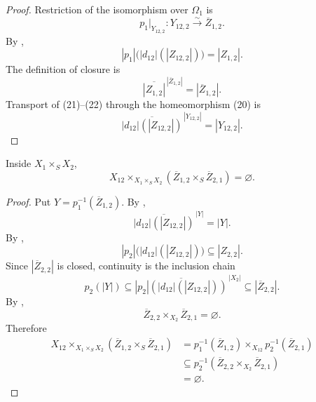 \begin{proof}
  Restriction of the isomorphism over $\Omega_1$ is
  \[
    p_1|_{Y_{12,2}}\colon
      Y_{12,2}\xrightarrow{\sim}\overline Z_{1,2}.                 \tag{20}
  \]
  By ,
  \[
    |p_1|\bigl(|d_{12}|(|Z_{12,2}|)\bigr)=|Z_{1,2}|.              \tag{21}
  \]
  The definition of closure is
  \[
    \overline{|Z_{1,2}|}^{\,|\overline Z_{1,2}|}
      =|\overline Z_{1,2}|.                                      \tag{22}
  \]
  Transport of (21)--(22) through the homeomorphism (20) is
  \[
    \overline{|d_{12}|(|Z_{12,2}|)}^{\,|Y_{12,2}|}=|Y_{12,2}|.
  \]
\end{proof}

\begin{lemma}
  \label{lemma:nagata-key-boundary-disjointness}

  Inside $X_1\times_SX_2$,
  \[
    X_{12}\times_{X_1\times_SX_2}
      (\overline Z_{1,2}\times_S\overline Z_{2,1})
    =\varnothing.
  \]
\end{lemma}

\begin{proof}
  Put $Y=p_1^{-1}(\overline Z_{1,2})$.  By
  ,
  \[
    \overline{|d_{12}|(|Z_{12,2}|)}^{\,|Y|}=|Y|.                  \tag{23}
  \]
  By ,
  \[
    |p_2|\bigl(|d_{12}|(|Z_{12,2}|)\bigr)\subseteq|Z_{2,2}|.      \tag{24}
  \]
  Since $|\overline Z_{2,2}|$ is closed, continuity is the inclusion chain
  \[
    p_2(|Y|)
      \subseteq
      \overline{|p_2|(|d_{12}|(|Z_{12,2}|))}^{\,|X_2|}
      \subseteq|\overline Z_{2,2}|.                               \tag{25}
  \]
  By ,
  \[
    \overline Z_{2,2}\times_{X_2}\overline Z_{2,1}=\varnothing.   \tag{26}
  \]
  Therefore
  \[
  \begin{aligned}
    X_{12}\times_{X_1\times_SX_2}
      (\overline Z_{1,2}\times_S\overline Z_{2,1})
      &=
        p_1^{-1}(\overline Z_{1,2})
          \times_{X_{12}}
        p_2^{-1}(\overline Z_{2,1})\\
      &\subseteq
        p_2^{-1}(
          \overline Z_{2,2}\times_{X_2}\overline Z_{2,1})\\
      &=\varnothing.
  \end{aligned}
  \]
\end{proof}


